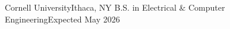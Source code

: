 \resumeSubheading
    {Cornell University}{Ithaca, NY}
    {B.S. in Electrical \& Computer Engineering}{Expected May 2026}
    \resumeItemListStart
    \resumeItemListEnd
